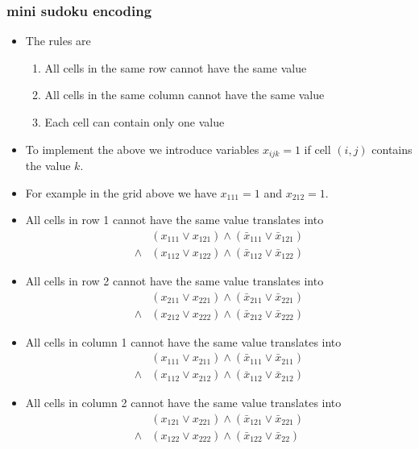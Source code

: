 \documentclass{beamer}
\begin{document}
\begin{frame}
  \frametitle{mini sudoku encoding}
  \begin{itemize}
  \item The rules are
    \begin{enumerate}
    \item All cells in the same row cannot have the same value
    \item All cells in the same column cannot have the same value
    \item Each cell can contain only one value
    \end{enumerate}
\item To implement the above we introduce variables $x_{ijk}=1$ if cell $(i,j)$ contains the value $k$. 
   \item For example in the grid above we have $x_{111}=1$ and $x_{212}=1$.
  \end{itemize}
\end{frame}
\begin{frame}
  \begin{itemize}
  \item All cells in row 1  cannot have the same value translates into
    \begin{align*}
      &(x_{111}\vee x_{121})\wedge (\bar{x}_{111}\vee \bar{x}_{121})\\
    \wedge & (x_{112}\vee x_{122})\wedge (\bar{x}_{112}\vee\bar{x}_{122})
    \end{align*}
\item All cells in row 2 cannot have the same value translates into
  \begin{align*}
     &(x_{211}\vee x_{221})\wedge (\bar{x}_{211}\vee \bar{x}_{221})\\
    \wedge & (x_{212}\vee x_{222})\wedge (\bar{x}_{212}\vee\bar{x}_{222})
  \end{align*}
\item All cells in column 1 cannot have the same value translates into
  \begin{align*}
     &(x_{111}\vee x_{211})\wedge (\bar{x}_{111}\vee \bar{x}_{211})\\
    \wedge & (x_{112}\vee x_{212})\wedge (\bar{x}_{112}\vee\bar{x}_{212})
  \end{align*}
\item All cells in column 2 cannot have the same value translates into
  \begin{align*}
     &(x_{121}\vee x_{221})\wedge (\bar{x}_{121}\vee \bar{x}_{221})\\
    \wedge & (x_{122}\vee x_{222})\wedge (\bar{x}_{122}\vee\bar{x}_{22})
  \end{align*}
  \end{itemize}
\end{frame}
\end{document}
